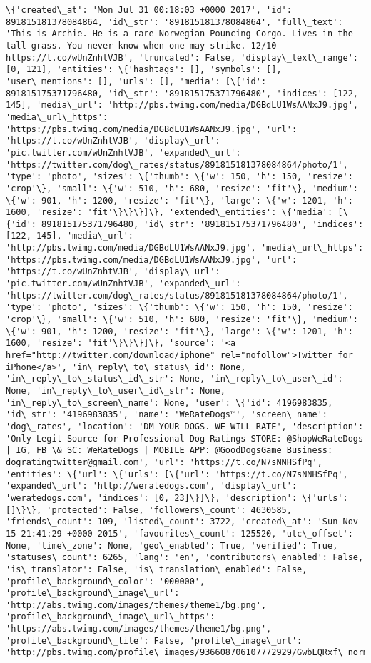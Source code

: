 \documentclass[11pt]{article}
\begin{document}
\begin{Verbatim}[commandchars=\\\{\}]
\{'created\_at': 'Mon Jul 31 00:18:03 +0000 2017', 'id': 891815181378084864, 'id\_str': '891815181378084864', 'full\_text': 'This is Archie. He is a rare Norwegian Pouncing Corgo. Lives in the tall grass. You never know when one may strike. 12/10 https://t.co/wUnZnhtVJB', 'truncated': False, 'display\_text\_range': [0, 121], 'entities': \{'hashtags': [], 'symbols': [], 'user\_mentions': [], 'urls': [], 'media': [\{'id': 891815175371796480, 'id\_str': '891815175371796480', 'indices': [122, 145], 'media\_url': 'http://pbs.twimg.com/media/DGBdLU1WsAANxJ9.jpg', 'media\_url\_https': 'https://pbs.twimg.com/media/DGBdLU1WsAANxJ9.jpg', 'url': 'https://t.co/wUnZnhtVJB', 'display\_url': 'pic.twitter.com/wUnZnhtVJB', 'expanded\_url': 'https://twitter.com/dog\_rates/status/891815181378084864/photo/1', 'type': 'photo', 'sizes': \{'thumb': \{'w': 150, 'h': 150, 'resize': 'crop'\}, 'small': \{'w': 510, 'h': 680, 'resize': 'fit'\}, 'medium': \{'w': 901, 'h': 1200, 'resize': 'fit'\}, 'large': \{'w': 1201, 'h': 1600, 'resize': 'fit'\}\}\}]\}, 'extended\_entities': \{'media': [\{'id': 891815175371796480, 'id\_str': '891815175371796480', 'indices': [122, 145], 'media\_url': 'http://pbs.twimg.com/media/DGBdLU1WsAANxJ9.jpg', 'media\_url\_https': 'https://pbs.twimg.com/media/DGBdLU1WsAANxJ9.jpg', 'url': 'https://t.co/wUnZnhtVJB', 'display\_url': 'pic.twitter.com/wUnZnhtVJB', 'expanded\_url': 'https://twitter.com/dog\_rates/status/891815181378084864/photo/1', 'type': 'photo', 'sizes': \{'thumb': \{'w': 150, 'h': 150, 'resize': 'crop'\}, 'small': \{'w': 510, 'h': 680, 'resize': 'fit'\}, 'medium': \{'w': 901, 'h': 1200, 'resize': 'fit'\}, 'large': \{'w': 1201, 'h': 1600, 'resize': 'fit'\}\}\}]\}, 'source': '<a href="http://twitter.com/download/iphone" rel="nofollow">Twitter for iPhone</a>', 'in\_reply\_to\_status\_id': None, 'in\_reply\_to\_status\_id\_str': None, 'in\_reply\_to\_user\_id': None, 'in\_reply\_to\_user\_id\_str': None, 'in\_reply\_to\_screen\_name': None, 'user': \{'id': 4196983835, 'id\_str': '4196983835', 'name': 'WeRateDogs™', 'screen\_name': 'dog\_rates', 'location': 'DM YOUR DOGS. WE WILL RATE', 'description': 'Only Legit Source for Professional Dog Ratings STORE: @ShopWeRateDogs | IG, FB \& SC: WeRateDogs | MOBILE APP: @GoodDogsGame Business: dogratingtwitter@gmail.com', 'url': 'https://t.co/N7sNNHSfPq', 'entities': \{'url': \{'urls': [\{'url': 'https://t.co/N7sNNHSfPq', 'expanded\_url': 'http://weratedogs.com', 'display\_url': 'weratedogs.com', 'indices': [0, 23]\}]\}, 'description': \{'urls': []\}\}, 'protected': False, 'followers\_count': 4630585, 'friends\_count': 109, 'listed\_count': 3722, 'created\_at': 'Sun Nov 15 21:41:29 +0000 2015', 'favourites\_count': 125520, 'utc\_offset': None, 'time\_zone': None, 'geo\_enabled': True, 'verified': True, 'statuses\_count': 6265, 'lang': 'en', 'contributors\_enabled': False, 'is\_translator': False, 'is\_translation\_enabled': False, 'profile\_background\_color': '000000', 'profile\_background\_image\_url': 'http://abs.twimg.com/images/themes/theme1/bg.png', 'profile\_background\_image\_url\_https': 'https://abs.twimg.com/images/themes/theme1/bg.png', 'profile\_background\_tile': False, 'profile\_image\_url': 'http://pbs.twimg.com/profile\_images/936608706107772929/GwbLQRxf\_normal.jpg', 
\end{Verbatim}
\end{document}
